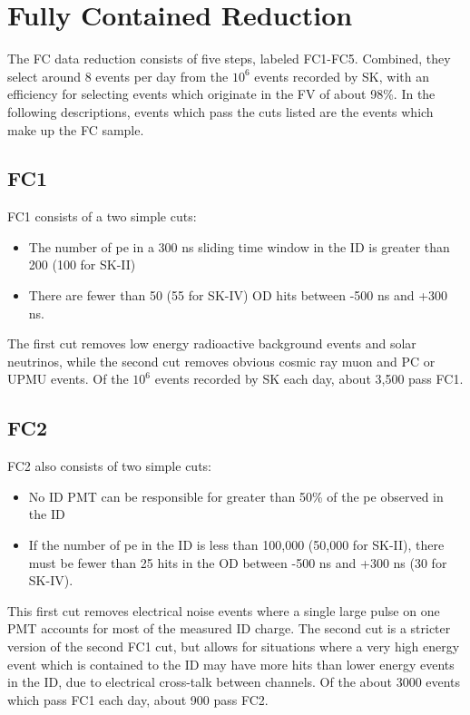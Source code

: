 \section{Fully Contained Reduction}
\label{sec:FC}
The FC data reduction consists of five steps, labeled FC1-FC5.  Combined, they select around 8 events per day from the $10^6$ events recorded by SK, with an efficiency for selecting events which originate in the FV of about 98\%.  In the following descriptions, events which pass the cuts listed are the events which make up the FC sample.
\subsection{FC1}
FC1 consists of a two simple cuts:
\begin{itemize}
\item The number of pe in a 300 ns sliding time window in the ID is greater than 200 (100 for SK-II)
\item There are fewer than 50 (55 for SK-IV) OD hits between -500 ns and +300 ns.
\end{itemize}
The first cut removes low energy radioactive background events and solar neutrinos, while the second cut removes obvious cosmic ray muon and PC or UPMU events.  Of the $10^6$ events recorded by SK each day, about 3,500 pass FC1.

\subsection{FC2}
FC2 also consists of two simple cuts:
\begin{itemize}
\item No ID PMT can be responsible for greater than 50\% of the pe observed in the ID
\item If the number of pe in the ID is less than 100,000 (50,000 for SK-II), there must be fewer than 25 hits in the OD between -500 ns and +300 ns (30 for SK-IV).
\end{itemize}
This first cut removes electrical noise events where a single large pulse on one PMT accounts for most of the measured ID charge.  The second cut is a stricter version of the second FC1 cut, but allows for situations where a very high energy event which is contained to the ID may have more hits than lower energy events in the ID, due to electrical cross-talk between channels.  Of the about 3000 events which pass FC1 each day, about 900 pass FC2.

